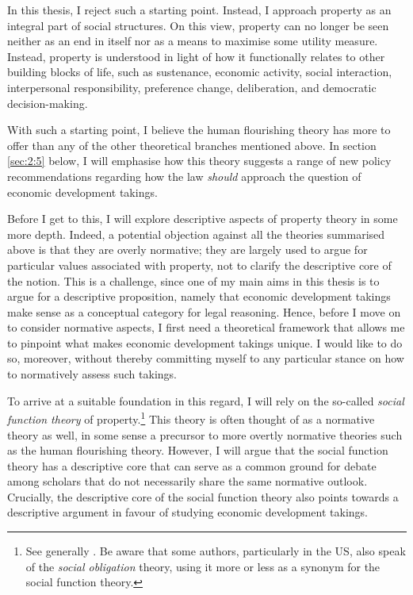 In this thesis, I reject such a starting point. Instead, I approach property as an integral part of social structures. On this view, property can no longer be seen neither as an end in itself nor as a means to maximise some utility measure. Instead, property is understood in light of how it functionally relates to other building blocks of life, such as sustenance, economic activity, social interaction, interpersonal responsibility, preference change, deliberation, and democratic decision-making.

With such a starting point, I believe the human flourishing theory has more to offer than any of the other theoretical branches mentioned above. In section \ref{sec:2:5} below, I will emphasise how this theory suggests a range of new policy recommendations regarding how the law {\it should} approach the question of economic development takings.

Before I get to this, I will explore descriptive aspects of property theory in some more depth. Indeed, a potential objection against all the theories summarised above is that they are overly normative; they are largely used to argue for particular values associated with property, not to clarify the descriptive core of the notion. This is a challenge, since one of my main aims in this thesis is to argue for a descriptive proposition, namely that economic development takings make sense as a conceptual category for legal reasoning. Hence, before I move on to consider normative aspects, I first need a theoretical framework that allows me to pinpoint what makes economic development takings unique. I would like to do so, moreover, without thereby committing myself to any particular stance on how to normatively assess such takings.

To arrive at a suitable foundation in this regard, I will rely on the so-called {\it social function theory} of property.\footnote{See generally \cite{foster11,mirow10,alexander09a}. Be aware that some authors, particularly in the US, also speak of the {\it social obligation} theory, using it more or less as a synonym for the social function theory.} This theory is often thought of as a normative theory as well, in some sense a precursor to more overtly normative theories such as the human flourishing theory. However, I will argue that the social function theory has a descriptive core that can serve as a common ground for debate among scholars that do not necessarily share the same normative outlook. Crucially, the descriptive core of the social function theory also points towards a descriptive argument in favour of studying economic development takings.


